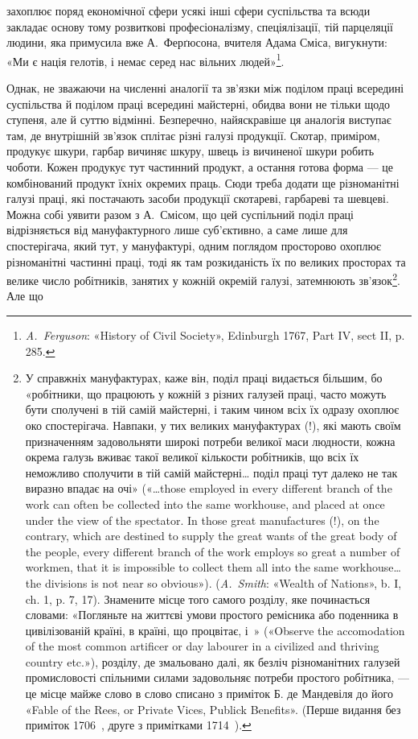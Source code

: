 \parcont{}  %
захоплює поряд економічної сфери усякі інші сфери суспільства
та всюди закладає основу тому розвиткові професіоналізму,
спеціялізації, тій парцеляції людини, яка примусила вже А.~Ферґюсона,
вчителя Адама Сміса, вигукнути: «Ми є нація гелотів,
і немає серед нас вільних людей»\footnote{
\emph{A.~Ferguson}: «History of Civil Society», Edinburgh 1767, Part IV,
sect II, p. 285.
}.

Однак, не зважаючи на численні аналогії та зв’язки між поділом
праці всередині суспільства й поділом праці всередині майстерні,
обидва вони не тільки щодо ступеня, але й суттю відмінні.
Безперечно, найяскравіше ця аналогія виступає там, де внутрішній
зв’язок сплітає різні галузі продукції. Скотар, приміром,
продукує шкури, гарбар вичиняє шкуру, швець із вичиненої
шкури робить чоботи. Кожен продукує тут частинний продукт,
а остання готова форма — це комбінований продукт їхніх окремих
праць. Сюди треба додати ще різноманітні галузі праці, які
постачають засоби продукції скотареві, гарбареві та шевцеві.
Можна собі уявити разом з А.~Смісом, що цей суспільний поділ
праці відрізняється від мануфактурного лише суб’єктивно, а саме
лише для спостерігача, який тут, у мануфактурі, одним поглядом
просторово охоплює різноманітні частинні праці, тоді як там розкиданість
їх по великих просторах та велике число робітників,
занятих у кожній окремій галузі, затемнюють зв’язок\footnote{
У справжніх мануфактурах, каже він, поділ праці видається
більшим, бо «робітники, що працюють у кожній з різних галузей праці,
часто можуть бути сполучені в тій самій майстерні, і таким чином всіх
їх одразу охоплює око спостерігача. Навпаки, у тих великих мануфактурах
(!), які мають своїм призначенням задовольняти широкі потреби
великої маси людности, кожна окрема галузь вживає такої великої кількости
робітників, що всіх їх неможливо сполучити в тій самій майстерні\dots{}
поділ праці тут далеко не так виразно впадає на очі» («\dots{}those employed
in every different branch of the work can often be collected into the
same workhouse, and placed at once under the view of the spectator. In
those great manufactures (!), on the contrary, which are destined to supply
the great wants of the great body of the people, every different branch of
the work employs so great a number of workmen, that it is impossible
to collect them all into the same workhouse\dots{} the divisions is not near
so obvious»). (\emph{A.~Smith}: «Wealth of Nations», b. I, ch. 1, p. 7, 17).
Знамените місце того самого розділу, яке починається словами:
«Погляньте на життєві умови простого ремісника або поденника в
цивілізованій країні, в країні, що процвітає, і~» («Observe the accomodation
of the most common artificer or day labourer in a civilized and
thriving country etc.»), розділу, де змальовано далі, як безліч різноманітних
галузей промисловості спільними силами задовольняє потреби
простого робітника, — це місце майже слово в слово списано з приміток
Б. де Мандевіля до його «Fable of the Rees, or Private Vices, Publick Benefits».
(Перше видання без приміток 1706~, друге з примітками 1714~).
}. Але що
